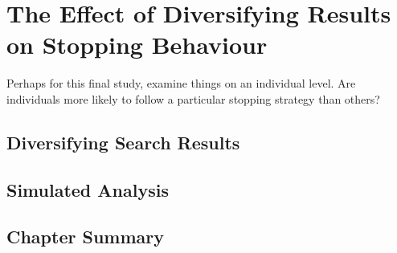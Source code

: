 
\chapter{The Effect of Diversifying Results on Stopping Behaviour}\label{chap:diversity}
Perhaps for this final study, examine things on an individual level. Are individuals more likely to follow a particular stopping strategy than others?

\section{Diversifying Search Results}

\section{Simulated Analysis}

\section{Chapter Summary}